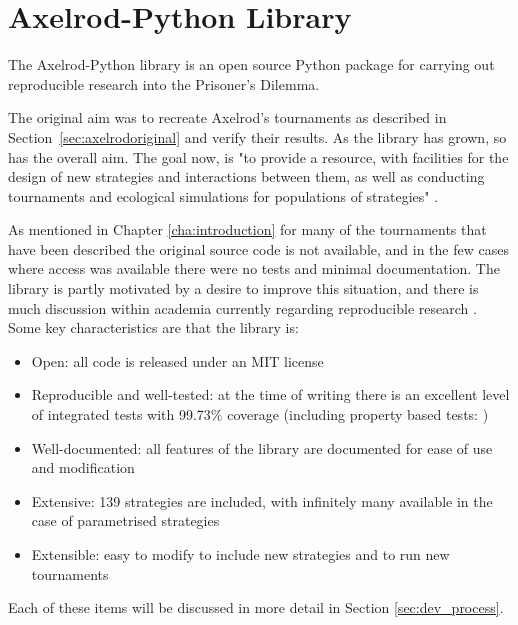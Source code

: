 
\section{Axelrod-Python Library}\label{sec:axelrod-python}

The Axelrod-Python library \cite{axelrodproject} is an open source Python package for carrying out reproducible research into the Prisoner's Dilemma.

The original aim was to recreate Axelrod's tournaments as described in Section~\ref{sec:axelrodoriginal} and verify their results.
As the library has grown, so has the overall aim.
The goal now, is "to provide a resource, with facilities for the design of new strategies and interactions between them, as well as conducting tournaments and ecological simulations for populations of strategies" \cite{Knight2016}.

As mentioned in Chapter \ref{cha:introduction} for many of the tournaments that have been described the original source code is not available, and in the few cases where access was available there were no tests and minimal documentation.
The library is partly motivated by a desire to improve this situation, and there is much discussion within academia currently regarding reproducible research \cite{Crick2014, Hong2015, Procter2012, Sandve2013}.
Some key characteristics are that the library is:

\begin{itemize}
    \item Open: all code is released under an MIT license \cite{Rosen2004}
    \item Reproducible and well-tested: at the time of writing there is an excellent level of integrated tests with 99.73\% coverage (including property based tests: \cite{Hypothesis3.6.1})
    \item Well-documented: all features of the library are documented for ease of use and modification
    \item Extensive: 139 strategies are included, with infinitely many available in the case of parametrised strategies
    \item Extensible: easy to modify to include new strategies and to run new tournaments
\end{itemize}

Each of these items will be discussed in more detail in Section \ref{sec:dev_process}.

